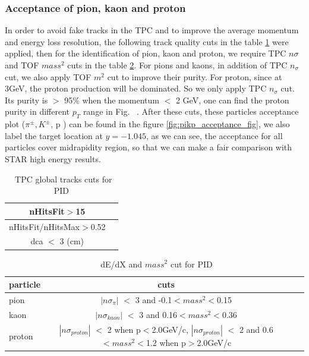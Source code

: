 \subsubsection{Acceptance of pion, kaon and proton}
In order to avoid fake tracks in the TPC and to improve the average momentum and energy loss resolution, the following track quality cuts in the table \ref{tab:tpc_cut_pid} were applied, then for the identification of pion, kaon and proton, we require TPC $n\sigma$ and TOF $mass^{2}$ cuts in the table \ref{tab:dedx_mass_cut_pid}. For pions and kaons, in addition of TPC $n_{\sigma}$ cut, we also apply TOF $m^{2}$ cut to improve their purity. For proton, since at 3GeV, the proton production will be dominated. So we only apply TPC $n_{\sigma}$ cut. Its purity is $>$ 95\% when the momentum $<$ 2 GeV, one can find the proton purity in different $p_{T}$ range in Fig. ~\cite{fig_proton_purity}. After these cuts, these particles acceptance plot ($\pi^{\pm}, K^{\pm}$, p ) can be found in the figure \ref{fig:pikp_acceptance_fig}, we also label the target location at $y = -1.045$, as we can see, the acceptance for all particles cover midrapidity region, so that we can make a fair comparison with STAR high energy results.
 
 \begin{table}[!ht]
\caption{\ TPC global tracks cuts for PID}
\label{tab:tpc_cut_pid}
\begin{tabular}{|c|c|}
\hline
nHitsFit$>$15 \\ \hline
nHitsFit/nHitsMax$>$0.52 \\ \hline
dca $<$ 3 (cm) \\ \hline
\end{tabular}
\end{table}


\begin{table}[ht]
\caption{\ dE/dX and $mass^{2}$ cut for PID}
\label{tab:dedx_mass_cut_pid}
\begin{tabular}{lclc|}
\hline
particle & cuts \\ \hline
pion  &  $|n\sigma_{\pi}|$ $<$ 3 and -0.1$<mass^{2}<$0.15 \\  \hline
kaon & $|n\sigma_{kaon}|$ $<$ 3 and 0.16$<mass^{2}<$0.36 \\ \hline
proton & $|n\sigma_{proton}|$ $<$ 2 when p$<$2.0GeV/c, $|n\sigma_{proton}|$ $<$ 2 and 0.6$<mass^{2}<$1.2 when p$>$2.0GeV/c  \\ \hline
\end{tabular}
\end{table}

